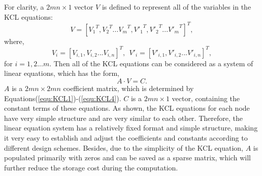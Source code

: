 For clarity, a ${2mn\times 1}$ vector ${V}$ is defined to represent all of the variables in the KCL equations:
\begin{equation}\label{equ:V1}
{V}=[{V_1}^T,{V_2}^T...{V_m}^T,{V'_1}^T,{V'_2}^T...{V'_m}^T]^T,
\end{equation}
where,
\begin{equation}\label{equ:V2}
{V_i} = [V_{i,1},V_{i,2}...V_{i,n}]^T,~~{V'_i} = [V'_{i,1},V'_{i,2}...V'_{i,n}]^T,
\end{equation}
for $i=1,2...m$. Then all of the KCL equations can be considered as a system of linear equations, which has the form,
\begin{equation}\label{equ:matrix}
A\cdot V = C.
\end{equation}
$A$ is a ${2mn\times{2mn}}$ coefficient matrix, which is determined by
Equations(\ref{equ:KCL1})-(\ref{equ:KCL4}). $C$ is a ${2mn\times{1}}$
vector, containing the constant terms of these equations. As shown, the
KCL equations for each node have very simple structure and are very
similar to each other. Therefore, the linear equation system has a
relatively fixed format and simple structure, making it very easy to
establish and adjust the coefficients and constants according to different
design schemes. Besides, due to the simplicity of the KCL equation, $A$ is
populated primarily with zeros and can be saved as a sparse matrix, which
will further reduce the storage cost during the computation. 

